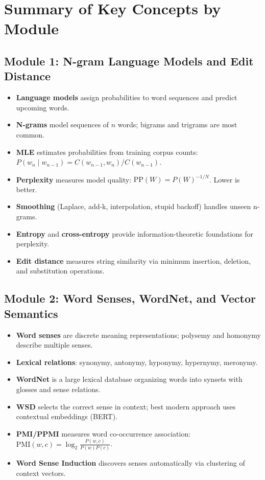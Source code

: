\documentclass[11pt,a4paper]{article}
\begin{document}
\section{Summary of Key Concepts by Module}

\subsection{Module 1: N-gram Language Models and Edit Distance}
\begin{itemize}
    \item \textbf{Language models} assign probabilities to word sequences and predict upcoming words.
    \item \textbf{N-grams} model sequences of $n$ words; bigrams and trigrams are most common.
    \item \textbf{MLE} estimates probabilities from training corpus counts: $P(w_n \mid w_{n-1}) = C(w_{n-1}, w_n) / C(w_{n-1})$.
    \item \textbf{Perplexity} measures model quality: $\text{PP}(W) = P(W)^{-1/N}$. Lower is better.
    \item \textbf{Smoothing} (Laplace, add-k, interpolation, stupid backoff) handles unseen n-grams.
    \item \textbf{Entropy} and \textbf{cross-entropy} provide information-theoretic foundations for perplexity.
    \item \textbf{Edit distance} measures string similarity via minimum insertion, deletion, and substitution operations.
\end{itemize}

\subsection{Module 2: Word Senses, WordNet, and Vector Semantics}
\begin{itemize}
    \item \textbf{Word senses} are discrete meaning representations; polysemy and homonymy describe multiple senses.
    \item \textbf{Lexical relations}: synonymy, antonymy, hyponymy, hypernymy, meronymy.
    \item \textbf{WordNet} is a large lexical database organizing words into synsets with glosses and sense relations.
    \item \textbf{WSD} selects the correct sense in context; best modern approach uses contextual embeddings (BERT).
    \item \textbf{PMI/PPMI} measures word co-occurrence association: $\text{PMI}(w, c) = \log_2 \frac{P(w, c)}{P(w)P(c)}$.
    \item \textbf{Word Sense Induction} discovers senses automatically via clustering of context vectors.
\end{itemize}
\end{document}
